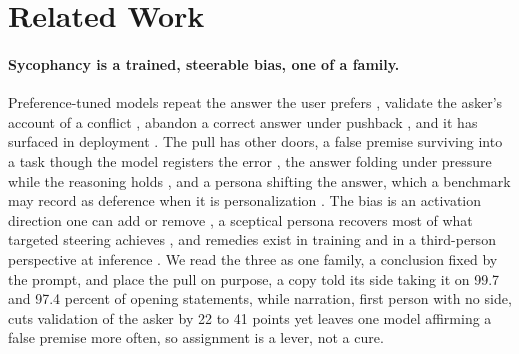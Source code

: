 \section{Related Work}
\label{sec-related}

\paragraph{Sycophancy is a trained, steerable bias, one of a family.}
Preference-tuned models repeat the answer the user prefers
\citep{perez2023discovering,sharma23}, validate the asker's account of a
conflict \citep{cheng25elephant,cheng2026prosocial}, abandon a correct answer
under pushback
\citep{fanous2025syceval,malmqvist24,hong2025sycophancy,nikeghbal2026flips},
and it has surfaced in deployment \citep{openai_sycophancy_2025}. The pull has
other doors, a false premise surviving into a task though the model registers
the error \citep{chen2026knowing,petrov2025brokenmath}, the answer folding
under pressure while the reasoning holds \citep{li2026chain}, and a persona
shifting the answer, which a benchmark may record as deference when it is
personalization \citep{batzner2025claims}. The bias is an activation direction
one can add or remove
\citep{rimsky2024caa,chen2025persona,vennemeyer2025separation}, a sceptical
persona recovers most of what targeted steering achieves
\citep{kelkar2026devil}, and remedies exist in training
\citep{wei2023synthetic,chen2024yesmen} and in a third-person perspective at
inference \citep{hong2025sycophancy}. We read the three as one family, a
conclusion fixed by the prompt, and place the pull on purpose, a copy told its
side taking it on 99.7 and 97.4 percent of opening statements, while
narration, first person with no side, cuts validation of the asker by 22 to 41
points yet leaves one model affirming a false premise more often, so
assignment is a lever, not a cure.

